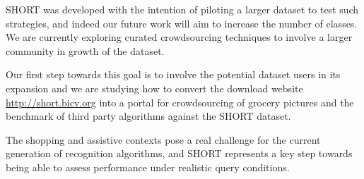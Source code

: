 SHORT was developed with the intention of piloting a larger dataset to test such strategies, and indeed our future work will aim to increase the number of classes. We are currently exploring curated crowdsourcing techniques to involve a larger community in growth of the dataset.

Our first step towards this goal is to involve the potential dataset users in its expansion and we are studying how to convert the download website \url{http://short.bicv.org} into a portal for crowdsourcing of grocery pictures and the benchmark of third party algorithms against the SHORT dataset.

The shopping and assistive contexts pose a real challenge for the current generation of recognition algorithms, and SHORT represents a key step towards being able to assess performance under realistic query conditions.




